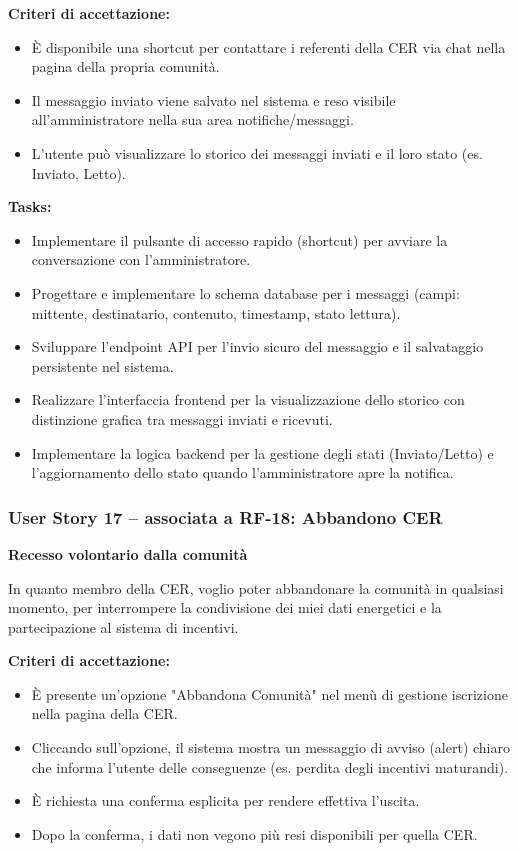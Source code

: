 \textbf{Criteri di accettazione:}
\begin{itemize}
    \item È disponibile una shortcut per contattare i referenti della CER via chat nella pagina della propria comunità.
    \item Il messaggio inviato viene salvato nel sistema e reso visibile all'amministratore nella sua area notifiche/messaggi.
    \item L'utente può visualizzare lo storico dei messaggi inviati e il loro stato (es. Inviato, Letto).
\end{itemize}

\textbf{Tasks:}
\begin{itemize}
    \item Implementare il pulsante di accesso rapido (shortcut) per avviare la conversazione con l'amministratore.
    \item Progettare e implementare lo schema database per i messaggi (campi: mittente, destinatario, contenuto, timestamp, stato lettura).
    \item Sviluppare l'endpoint API per l'invio sicuro del messaggio e il salvataggio persistente nel sistema.
    \item Realizzare l'interfaccia frontend per la visualizzazione dello storico con distinzione grafica tra messaggi inviati e ricevuti.
    \item Implementare la logica backend per la gestione degli stati (Inviato/Letto) e l'aggiornamento dello stato quando l'amministratore apre la notifica.
\end{itemize}

\subsubsection*{User Story 17 – associata a RF-18: Abbandono CER}
\textbf{Recesso volontario dalla comunità}

In quanto membro della CER, voglio poter abbandonare la comunità in qualsiasi momento, per interrompere la condivisione dei miei dati energetici e la partecipazione al sistema di incentivi.

\textbf{Criteri di accettazione:}
\begin{itemize}
    \item È presente un'opzione "Abbandona Comunità" nel menù di gestione iscrizione nella pagina della CER.
    \item Cliccando sull'opzione, il sistema mostra un messaggio di avviso (alert) chiaro che informa l'utente delle conseguenze (es. perdita degli incentivi maturandi).
    \item È richiesta una conferma esplicita per rendere effettiva l'uscita.
    \item Dopo la conferma, i dati non vegono più resi disponibili per quella CER.
\end{itemize}

